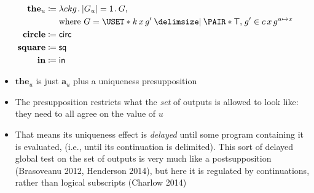 \documentclass[10pt,fleqn]{article}
\begin{document}
\begin{minipage}[t]{0.3\textwidth}
\begin{spreadlines}{0pt}
\begin{align*}
  \textbf{the}_u &\coloneq
    \l ckg \dt |G_u| = 1 \dt G, \\
  &\hphantom{{}\coloneq{}}
    \text{where}\ 
    G = \uset{k\,x\,g' \giv \pair{\cn{T}}{g'} \in c\,x\,g^{u\mapsto x}} \\
  \textbf{circle} &\coloneq
  \cn{circ} \\
  \textbf{square} &\coloneq
  \cn{sq} \\
  \textbf{in} &\coloneq
  \cn{in}
\end{align*}  
\end{spreadlines}
\end{minipage}
%
%
\begin{minipage}[t]{0.7\textwidth}
\begin{spreadlines}{0pt}
\begin{itemize}
  \item
    $\textbf{the}_u$ is just $\textbf{a}_u$ plus a uniqueness presupposition
  \item
    The presupposition restricts what the \emph{set} of outputs is allowed to
    look like: they need to all agree on the value of $u$
  \item
    That means its uniqueness effect is \emph{delayed} until some program
    containing it is evaluated, (i.e., until its continuation is delimited).
    This sort of delayed global test on the set of outputs is very much like a
    postsupposition (Brasoveanu 2012, Henderson 2014), but here it is
    regulated by continuations, rather than logical subscripts (Charlow 2014)
\end{itemize}
\end{spreadlines}
\end{minipage}

\dotfill
\end{document}
